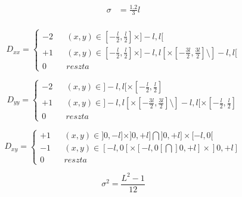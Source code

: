 \begin{align}
\sigma &= \frac{1.2}{3}l\\
\label{eqn:sigma_o_i_l}
\end{align}


\begin{equation}
D_{xx} = \left\lbrace \begin{array}{ccl}
-2&&  (x,y) \in [-\frac{l}{2},\frac{l}{2}]\times]-l,l[\\
+1&&  (x,y) \in [-\frac{l}{2},\frac{l}{2}]\times]-l,l[\times[-\frac{3l}{2},\frac{3l}{2}]\setminus]-l,l[ \\
0 && reszta
\end{array} \right.
\end{equation}

\begin{equation}
D_{yy} = \left\lbrace \begin{array}{ccl}
-2&&  (x,y) \in ]-l,l[\times[-\frac{l}{2},\frac{l}{2}]\\
+1&&  (x,y) \in ]-l,l[\times[-\frac{3l}{2},\frac{3l}{2}]\setminus]-l,l[\times[-\frac{l}{2},\frac{l}{2}] \\
0 && reszta 
\end{array} \right.
\end{equation}

\begin{equation}
D_{xy} = \left\lbrace \begin{array}{ccl}
+1&&  (x,y) \in ]0,-l]\times]0,+l]\bigcap]0,+l]\times[-l,0[ \\
-1&&  (x,y) \in [-l,0[\times[-l,0[\bigcap]0,+l]\times]0,+l]\\
0 && reszta
\end{array} \right.
\end{equation}




\begin{equation}
\sigma^2=\frac{L^2-1}{12}
\label{eqn:sigma_2_L}
\end{equation}


 


